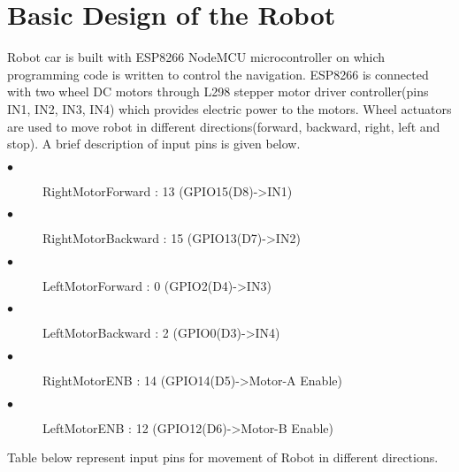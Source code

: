 \documentclass[sigconf]{acmart}
\begin{document}
\section{Basic Design of the Robot}
Robot car is built with ESP8266 NodeMCU microcontroller on which programming code is written to control the navigation. ESP8266 is connected with two wheel DC motors through L298 stepper motor driver controller(pins IN1, IN2, IN3, IN4) which provides electric power to the motors. Wheel actuators are used to move robot in different directions(forward, backward, right, left and stop).
A brief description of input pins is given below.
\begin{description}
    \item[$\bullet$] RightMotorForward  : 13  (GPIO15(D8)->IN1)
    \item[$\bullet$] RightMotorBackward : 15 (GPIO13(D7)->IN2)
    \item[$\bullet$] LeftMotorForward   : 0    (GPIO2(D4)->IN3)
    \item[$\bullet$] LeftMotorBackward  : 2   (GPIO0(D3)->IN4)
    \item[$\bullet$] RightMotorENB      : 14 (GPIO14(D5)->Motor-A Enable)
    \item[$\bullet$] LeftMotorENB       : 12  (GPIO12(D6)->Motor-B Enable)
\end{description}

Table below represent input pins for movement of Robot in different directions.
\end{document}
